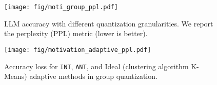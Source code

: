 \begin{figure}[t]
    \centering
    \begin{minipage}[t]{0.48\columnwidth}
      \centering
      \texttt{[image: fig/moti\_group\_ppl.pdf]}
      \caption{LLM accuracy with different quantization granularities. We report the perplexity (PPL) metric (lower is better).}\label{fig:moti_group_ppl} 
    \end{minipage}
    \hspace{2pt}
    \begin{minipage}[t]{0.48\columnwidth}
      \centering
      \texttt{[image: fig/motivation\_adaptive\_ppl.pdf]}
      \caption{Accuracy loss for \texttt{INT}, \texttt{ANT}, and Ideal (clustering algorithm K-Means) adaptive methods in group quantization. }\label{fig:moti_ppl} 
    \end{minipage}
\end{figure}